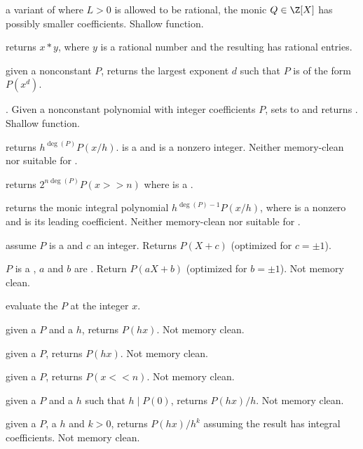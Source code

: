  a variant of 
where $L > 0$ is allowed to be rational, the monic $Q\in \Z[X]$ has possibly
smaller coefficients. Shallow function.

 returns $x*y$, where $y$ is a rational number
and the resulting  has rational entries.

 given a nonconstant 
$P$, returns the largest exponent $d$ such that $P$ is of the form $P(x^d)$.

. Given a nonconstant
polynomial with integer coefficients $P$, sets  to
 and returns . Shallow
function.

 returns $h^{\deg(P)} P(x/h)$.
 is a  and  is a nonzero integer. Neither memory-clean
nor suitable for .

 returns $2^{n\deg(P)} P(x>>n)$ where
 is a .

 returns the monic integral polynomial
$h^{\deg(P)-1} P(x/h)$, where  is a nonzero  and  is
its leading coefficient. Neither memory-clean nor suitable for
.

 assume $P$ is a  and $c$ an
integer. Returns $P(X + c)$ (optimized for $c = \pm 1$).

 $P$ is a , $a$ and $b$
are . Return $P(aX + b)$ (optimized for $b = \pm 1$). Not memory
clean.

 evaluate the  $P$ at the integer $x$.

 given a  $P$ and a  $h$,
returns $P(hx)$. Not memory clean.

 given a  $P$,
returns $P(hx)$. Not memory clean.

 given a  $P$, returns
$P(x<<n)$. Not memory clean.

 given a  $P$ and a  $h$
such that $h \mid P(0)$, returns $P(hx)/h$. Not memory clean.

 given a  $P$,
a  $h$ and $k > 0$, returns $P(hx)/h^k$ assuming the result has
integral coefficients. Not memory clean.

